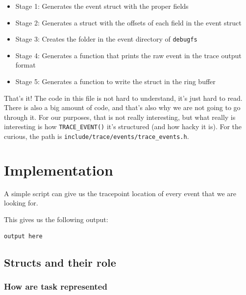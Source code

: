 \documentclass[10pt]{book}
\begin{document}
\begin{itemize}
    \item Stage 1: Generates the event struct with the proper fields
    \item Stage 2: Generates a struct with the offsets of each field in the event struct
    \item Stage 3: Creates the folder in the event directory of \verb|debugfs|
    \item Stage 4: Generates a function that prints the raw event in the trace output format
    \item Stage 5: Generates a function to write the struct in the ring buffer
\end{itemize}
That's it! The code in this file is not hard to understand, it's just hard to read. There is also a big amount of code, and that's also why we are not going to go through it. For our purposes, that is not really interesting, but what really is interesting is how \verb|TRACE_EVENT()| it's structured (and how hacky it is). For the curious, the path is \verb|include/trace/events/trace_events.h|.
\chapter{Implementation}
\label{chap:implementation}
A simple script can give us the tracepoint location of every event that we are looking for.
This gives us the following output:
\begin{Verbatim}
output here
\end{Verbatim}

\section{Structs and their role}

\subsection{How are task represented}
\end{document}
